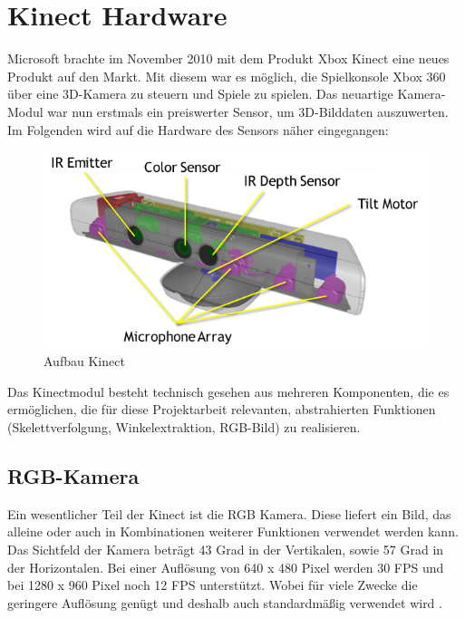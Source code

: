 \section{Kinect Hardware}
Microsoft brachte im November 2010 mit dem Produkt Xbox Kinect eine neues Produkt auf den Markt. Mit diesem war es möglich, die Spielkonsole Xbox 360 über eine 3D-Kamera zu steuern und Spiele zu spielen. Das neuartige Kamera-Modul war nun erstmals ein preiswerter Sensor, um 3D-Bilddaten auszuwerten.
Im Folgenden wird auf die Hardware des Sensors näher eingegangen:\\[0.2cm]

\begin{figure}[H]						
	\centering							
	\includegraphics[scale=0.9]{Bilder/kinect_sensor_aufbau.png}			
	\caption{Aufbau Kinect\cite{ws:microsoft_kinect}}						
	\label{f:kinect_hardware}						
\end{figure}

\noindent
Das Kinectmodul besteht technisch gesehen aus mehreren Komponenten, die es ermöglichen, die
für diese Projektarbeit relevanten, abstrahierten Funktionen (Skelettverfolgung, Winkelextraktion, RGB-Bild)
zu realisieren. \cite{webb2012beginning}

\subsection{RGB-Kamera}

	Ein wesentlicher Teil der Kinect ist die RGB Kamera. Diese liefert ein Bild, das alleine
	oder auch in Kombinationen weiterer Funktionen verwendet werden kann.
	Das Sichtfeld der Kamera beträgt 43 Grad in der Vertikalen, sowie 57 Grad in der Horizontalen.
	Bei einer Auflösung von 640 x 480 Pixel werden 30 \ac{FPS} und bei 1280 x 960 Pixel noch 12 \ac{FPS} unterstützt.
	Wobei für viele Zwecke die geringere Auflösung genügt und deshalb auch standardmäßig verwendet wird \cite{jana2012kinect}.

